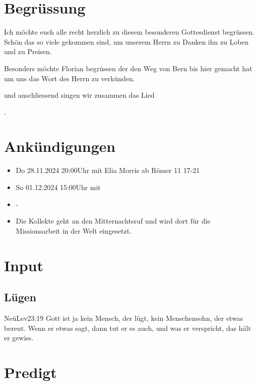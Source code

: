 
\section{Begrüssung}

Ich möchte euch alle recht herzlich zu diesem besonderen Gottesdienst begrüssen. Schön das so viele gekommen sind, um unserem Herrn zu Danken ihn zu Loben und zu Preisen.

Besonders möchte Florian begrüssen der den Weg von Bern bis hier gemacht hat um uns das Wort des Herrn zu verkünden. 

\noindent
\beten{} und anschliessend singen wir zusammen das Lied

\noindent
{}.

\section{Ankündigungen}
\begin{itemize}
    \item {} Do 28.11.2024 20:00Uhr mit Elia Morris ab Römer 11 17-21
    \item {} So 01.12.2024 15:00Uhr mit 
    \item {} -
    \item {} Die Kollekte geht an den Mitternachtsruf und wird dort für die Missionsarbeit in der Welt eingesetzt.
\end{itemize}

\section{ Input }
\begin{spacing}{1.5}
\subsection{Lügen}

\begin{bibelbox}{Neü}{Lev}{23:19}
Gott ist ja kein Mensch, der lügt, kein Menschensohn, der etwas bereut. Wenn er etwas sagt, dann tut er es auch, und was er verspricht, das hält er gewiss.
\end{bibelbox}


\end{spacing}


\section{Predigt}

